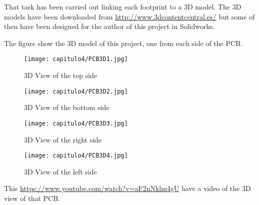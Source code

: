 That task has been carried out linking each footprint to a 3D model. The 3D models have been downloaded from \url{http://www.3dcontentcentral.es/} but some of then have been designed for the author of this project in Solidworks. 

 
The figure show the 3D model of this project, one from each side of the \acrshort{PCB}.


\begin{figure}[H]
	\centering
		\texttt{[image: capitulo4/PCB3D1.jpg]}
	\caption{3D View of the top side}
	\label{fig:PCB3D1}
\end{figure}

\begin{figure}[H]
	\centering
		\texttt{[image: capitulo4/PCB3D2.jpg]}
	\caption{3D View of the bottom side}
	\label{fig:PCB3D2}
\end{figure}

\begin{figure}[H]
	\centering
		\texttt{[image: capitulo4/PCB3D3.jpg]}
	\caption{3D View of the right side}
	\label{fig:PCB3D3}
\end{figure}

\begin{figure}[H]
	\centering
		\texttt{[image: capitulo4/PCB3D4.jpg]}
	\caption{3D View of the left side}
	\label{fig:PCB3D4}
\end{figure}

This \url{https://www.youtube.com/watch?v=aF2nNklm4gU} have a video of the 3D view of that PCB.



